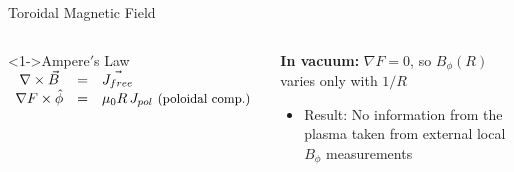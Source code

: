 \documentclass{beamer}
\begin{document}
\begin{frame}{Toroidal Magnetic Field}
\begin{columns}
\begin{block}<1->{Ampere$'$s Law}
$ \begin{array}{ccl}
   		\nabla \times \vec{B} &= & \vec{J_{free}} \\
		\nabla F \times \hat{\phi} &=&  \mu_0 R \, J_{pol}   \textrm{ \small (poloidal comp.)}
  \end{array} $
\end{block}

   \begin{itemize}
   	 {\item  \textbf{In vacuum:} $ \nabla F =0$, so $B_\phi (R)$ varies only  with $1 / R$
   	\begin{itemize}
   		\item  Result: No information from the plasma  taken from external local  $B_\phi $ measurements
 	\end{itemize}
	}
   \end{itemize}


\end{columns}
\end{frame}
\end{document}
